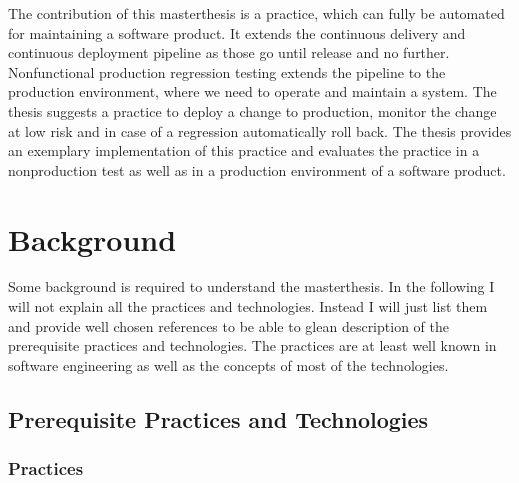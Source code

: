 The contribution of this masterthesis is a practice, which can fully be automated for
maintaining a software product. It extends the continuous delivery and continuous
deployment pipeline as those go until release and no further. Nonfunctional production
regression testing extends the pipeline to the production environment, where we need to
operate and maintain a system. The thesis suggests a practice to deploy a change to
production, monitor the change at low risk and in case of a regression automatically roll
back. The thesis provides an exemplary implementation of this practice and evaluates the
practice in a nonproduction test as well as in a production environment of a software
product.

\chapter{Background}

Some background is required to understand the masterthesis. In the following I will not
explain all the practices and technologies. Instead I will just list them and provide well
chosen references to be able to glean description of the prerequisite practices and
technologies. The practices are at least well known in software engineering as well as the
concepts of most of the technologies.

\section{Prerequisite Practices and Technologies}

\subsection{Practices}

